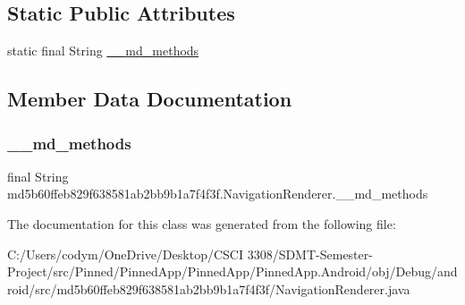 \subsection*{Static Public Attributes}
\begin{DoxyCompactItemize}
\item 
static final String \hyperlink{classmd5b60ffeb829f638581ab2bb9b1a7f4f3f_1_1_navigation_renderer_a6f16e4bf9cbed6430832e41a4d1bd118}{\+\_\+\+\_\+md\+\_\+methods}
\end{DoxyCompactItemize}


\subsection{Member Data Documentation}
\mbox{\label{classmd5b60ffeb829f638581ab2bb9b1a7f4f3f_1_1_navigation_renderer_a6f16e4bf9cbed6430832e41a4d1bd118}} 
\subsubsection{\texorpdfstring{\+\_\+\+\_\+md\+\_\+methods}{\_\_md\_methods}}
{\footnotesize\ttfamily final String md5b60ffeb829f638581ab2bb9b1a7f4f3f.\+Navigation\+Renderer.\+\_\+\+\_\+md\+\_\+methods\hspace{0.3cm}{\ttfamily [static]}}



The documentation for this class was generated from the following file\+:\begin{DoxyCompactItemize}
\item 
C\+:/\+Users/codym/\+One\+Drive/\+Desktop/\+C\+S\+C\+I 3308/\+S\+D\+M\+T-\/\+Semester-\/\+Project/src/\+Pinned/\+Pinned\+App/\+Pinned\+App/\+Pinned\+App.\+Android/obj/\+Debug/android/src/md5b60ffeb829f638581ab2bb9b1a7f4f3f/Navigation\+Renderer.\+java\end{DoxyCompactItemize}
